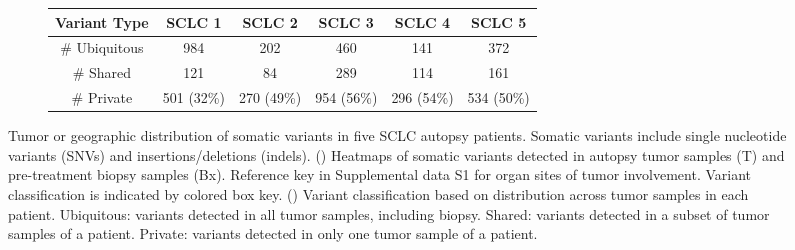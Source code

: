 \begin{figure}[p]
    \begin{subfigure}{\textwidth}
        \centering
        \begin{tabular}{cccccc}
            Variant Type & SCLC 1 & SCLC 2 & SCLC 3 & SCLC 4 & SCLC 5 \\
            \hline
            \# Ubiquitous & 984 & 202 & 460 & 141 & 372 \\
            \# Shared & 121 & 84 & 289 & 114 & 161 \\
            \# Private & 501 (32\%) & 270 (49\%) & 954 (56\%) & 296 (54\%) & 534 (50\%)
        \end{tabular}
        \caption{}\label{fig:sclc:clonal_mut_num}
    \end{subfigure}
    \vspace{-0.5cm}
    \caption[SNVs and indels in five SCLC patients.]{Tumor or geographic distribution of somatic variants in five SCLC autopsy patients. Somatic variants include single nucleotide variants (SNVs) and insertions/deletions (indels). () Heatmaps of somatic variants detected in autopsy tumor samples (T) and pre-treatment biopsy samples (Bx). Reference key in Supplemental data S1 for organ sites of tumor involvement. Variant classification is indicated by colored box key. () Variant classification based on distribution across tumor samples in each patient. Ubiquitous: variants detected in all tumor samples, including biopsy. Shared: variants detected in a subset of tumor samples of a patient. Private: variants detected in only one tumor sample of a patient.}
    \label{fig:sclc:mutation_overview}
\end{figure}

